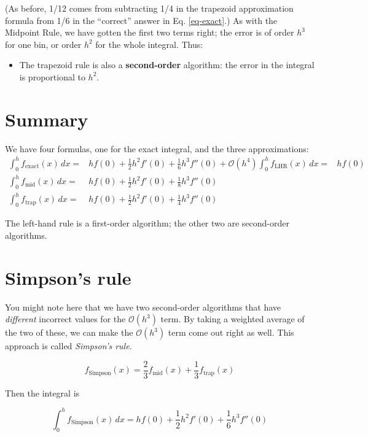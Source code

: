 \documentclass[12ampt]{article}
\begin{document}
(As before, 1/12 comes from subtracting 1/4 in the trapezoid approximation formula from 1/6 in the ``correct'' answer in Eq. \ref{eq-exact}.)
As with the Midpoint Rule, we have gotten the first two terms right; the error is of order $h^3$ for one bin, or order $h^2$ for the whole integral. Thus:

\begin{itemize}
      \item{The trapezoid rule is also a {\bf second-order} algorithm: the error in the integral is proportional to $h^2$.}
 \end{itemize}



 \section{Summary}

 We have four formulas, one for the exact integral, and the three approximations:
 \begin{align}
   \int_0^h f_{\mathrm{exact}}(x)\, dx=& hf(0) + \frac{1}{2}h^2f'(0) + \frac{1}{6} h^3 f''(0) + \mathcal O(h^4) 
 \int_0^h f_{\mathrm{LHR}}(x)\, dx =& hf(0) \\
 \int_0^h f_{\mathrm{mid}}(x)\, dx =& hf(0) + \frac{1}{2}h^2 f'(0) + \frac{1}{8} h^3 f''(0)\\ 
 \int_0^h f_{\mathrm{trap}}(x)\, dx =& hf(0) + \frac{1}{2}h^2 f'(0) + \frac{1}{4} h^3 f''(0)
 \end{align}

 The left-hand rule is a first-order algorithm; the other two are second-order algorithms.

 \section{Simpson's rule}

 You might note here that we have two second-order algorithms that have {\it different} incorrect values for the $\mathcal O(h^3)$ term. By taking a weighted average of the two of these, we can
 make the $\mathcal O(h^3)$ term come out right as well. This approach is called {\it Simpson's rule}.

 \begin{equation}
   f_{\mathrm{Simpson}}(x) = \frac{2}{3} f_{\mathrm{mid}}(x) + \frac{1}{3} f_{\mathrm{trap}}(x) 
 \end{equation}

 Then the integral is 

 \begin{equation}
 \int_0^h f_{\mathrm{Simpson}}(x)\, dx = hf(0) + \frac{1}{2}h^2 f'(0) + \frac{1}{6} h^3 f''(0)
 \end{equation}
\end{document}
